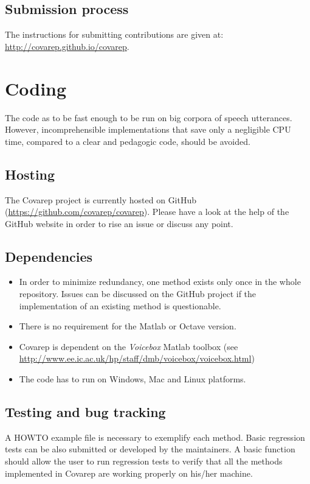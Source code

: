 \documentclass{article}
\begin{document}
    \subsection{Submission process}
    The instructions for submitting contributions are given at:
    \url{http://covarep.github.io/covarep}.

\newpage

\section{Coding}

    The code as to be fast enough to be run on big corpora of speech utterances.
    However, incomprehensible implementations that save only a negligible CPU time, compared to a clear and pedagogic code, should be avoided.

    \subsection{Hosting}
    The Covarep project is currently hosted on GitHub (\url{https://github.com/covarep/covarep}).
    Please have a look at the help of the GitHub website in order to rise an issue or discuss any point.

    \subsection{Dependencies}
    \begin{itemize}
    \item In order to minimize redundancy, one method exists only once in the whole repository. Issues can be discussed on the GitHub project if the implementation of an existing method is questionable.
    \item There is no requirement for the Matlab or Octave version.
    \item Covarep is dependent on the \textit{Voicebox} Matlab toolbox (see \url{http://www.ee.ic.ac.uk/hp/staff/dmb/voicebox/voicebox.html})
    \item The code has to run on Windows, Mac and Linux platforms.
    \end{itemize}

    \subsection{Testing and bug tracking}
    A HOWTO example file is necessary to exemplify each method.
    Basic regression tests can be also submitted or developed by the maintainers.
    A basic function should allow the user to run regression tests to verify that all the methods implemented in Covarep are working properly on his/her machine.
\end{document}
